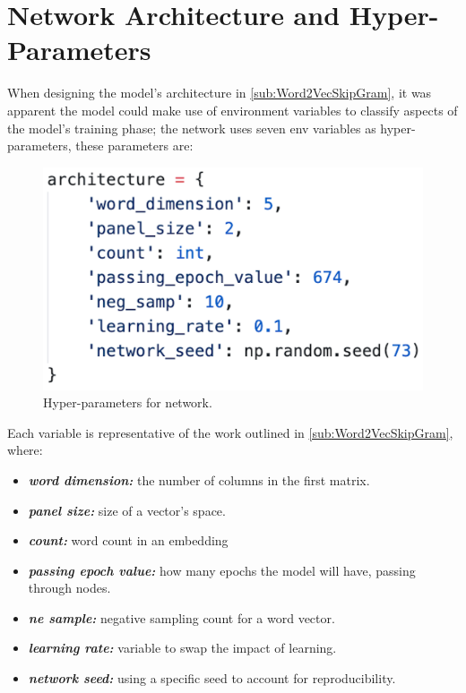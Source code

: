 \section{Network Architecture and Hyper-Parameters}

When designing the model's architecture in \autoref{sub:Word2VecSkipGram}, it was apparent the model could make use of environment variables to classify aspects of the model's training phase; the network uses seven env variables as hyper-parameters, these parameters are:

\begin{figure}[H]
    \centering
    \includegraphics[width=\textwidth]{figures/chapter-6/network_architecture.png}
    \caption[Hyper-parameters for network]{Hyper-parameters for network.
    \label{fig:network_Hyper_parameters}}
\end{figure}

\newpage

Each variable is representative of the work outlined in \autoref{sub:Word2VecSkipGram}, where:

\begin{itemize}
    \item \textbf{\textit{word dimension:}} the number of columns in the first matrix.
    \item \textbf{\textit{panel size:}} size of a vector's space.
    \item \textbf{\textit{count:}} word count in an embedding
    \item \textbf{\textit{passing epoch value:}} how many epochs the model will have, passing through nodes.
    \item \textbf{\textit{ne sample:}} negative sampling count for a word vector.
    \item \textbf{\textit{learning rate:}} variable to swap the impact of learning.
    \item \textbf{\textit{network seed:}} using a specific seed to account for reproducibility.
\end{itemize}


